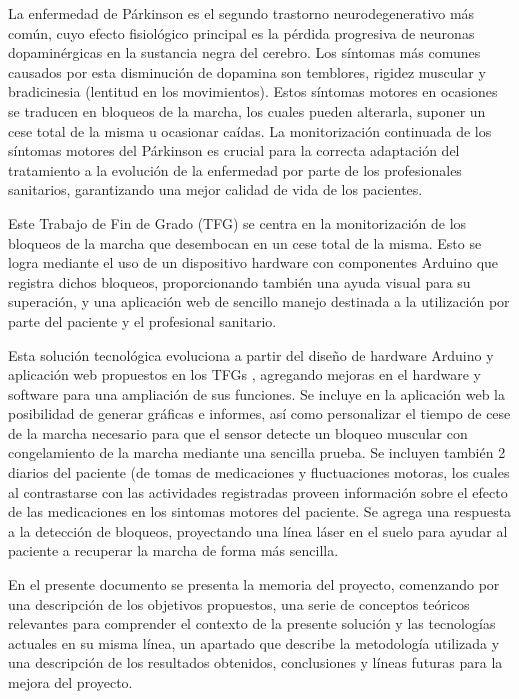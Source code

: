 

La enfermedad de Párkinson es el segundo trastorno neurodegenerativo más común, cuyo efecto fisiológico principal es la pérdida progresiva de neuronas dopaminérgicas en la sustancia negra del cerebro. Los síntomas más comunes causados por esta disminución de dopamina son temblores, rigidez muscular y bradicinesia (lentitud en los movimientos). Estos síntomas motores en ocasiones se traducen en bloqueos de la marcha, los cuales pueden alterarla, suponer un cese total de la misma u ocasionar caídas. La monitorización continuada de los síntomas motores del Párkinson es crucial para la correcta adaptación del tratamiento a la evolución de la enfermedad por parte de los profesionales sanitarios, garantizando una mejor calidad de vida de los pacientes.

Este Trabajo de Fin de Grado (TFG) se centra en la monitorización de los bloqueos de la marcha que desembocan en un cese total de la misma. Esto se logra mediante el uso de un dispositivo hardware con componentes Arduino que registra dichos bloqueos, proporcionando también una ayuda visual para su superación, y una aplicación web de sencillo manejo destinada a la utilización por parte del paciente y el profesional sanitario. 

Esta solución tecnológica evoluciona a partir del diseño de hardware Arduino y aplicación web propuestos en los TFGs \cite{Gonzalez2023} \cite{Martos2024}, agregando mejoras en el hardware y software para una ampliación de sus funciones. Se incluye en la aplicación web la posibilidad de generar gráficas e informes, así como personalizar el tiempo de cese de la marcha necesario para que el sensor detecte un bloqueo muscular con congelamiento de la marcha mediante una sencilla prueba. Se incluyen también 2 diarios del paciente (de tomas de medicaciones y fluctuaciones motoras, los cuales al contrastarse con las actividades registradas proveen información sobre el efecto de las medicaciones en los sintomas motores del paciente. Se agrega una respuesta a la detección de bloqueos, proyectando una línea láser en el suelo para ayudar al paciente a recuperar la marcha de forma más sencilla.

En el presente documento se presenta la memoria del proyecto, comenzando por una descripción de los objetivos propuestos, una serie de conceptos teóricos relevantes para comprender el contexto de la presente solución y las tecnologías actuales en su misma línea, un apartado que describe la metodología utilizada y una descripción de los resultados obtenidos, conclusiones y líneas futuras para la mejora del proyecto.

